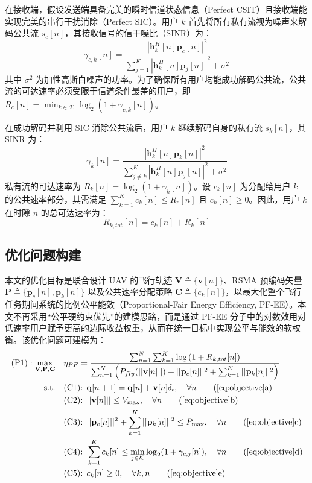 \documentclass[journal,onecolumn]{IEEEtran}
\begin{document}
	在接收端，假设发送端具备完美的瞬时信道状态信息（Perfect CSIT）且接收端能实现完美的串行干扰消除（Perfect SIC）。用户 $k$ 首先将所有私有流视为噪声来解码公共流 $s_c[n]$，其接收信号的信干噪比（SINR）为：
	\begin{equation}
		\gamma_{c,k}[n] = \frac{|\mathbf{h}_k^H[n] \mathbf{p}_c[n]|^2}{\sum_{j=1}^K |\mathbf{h}_k^H[n] \mathbf{p}_j[n]|^2 + \sigma^2}
		\label{eq:sinr_c}
	\end{equation}
	其中 $\sigma^2$ 为加性高斯白噪声的功率。为了确保所有用户均能成功解码公共流，公共流的可达速率必须受限于信道条件最差的用户，即 $R_c[n] = \min_{k \in \mathcal{K}} \log_2(1 + \gamma_{c,k}[n])$。
	
	在成功解码并利用 SIC 消除公共流后，用户 $k$ 继续解码自身的私有流 $s_k[n]$，其 SINR 为：
	\begin{equation}
		\gamma_k[n] = \frac{|\mathbf{h}_k^H[n] \mathbf{p}_k[n]|^2}{\sum_{j \neq k}^K |\mathbf{h}_k^H[n] \mathbf{p}_j[n]|^2 + \sigma^2}
		\label{eq:sinr_k}
	\end{equation}
	私有流的可达速率为 $R_k[n] = \log_2(1 + \gamma_k[n])$。设 $c_k[n]$ 为分配给用户 $k$ 的公共速率部分，其需满足 $\sum_{k=1}^K c_k[n] \leq R_c[n]$ 且 $c_k[n] \geq 0$。因此，用户 $k$ 在时隙 $n$ 的总可达速率为：
	\begin{equation}
		R_{k,tot}[n] = c_k[n] + R_k[n]
		\label{eq:total_rate}
	\end{equation}
	
	\subsection{优化问题构建}
	本文的优化目标是联合设计 UAV 的飞行轨迹 $\mathbf{V} \triangleq \{\mathbf{v}[n]\}$、RSMA 预编码矢量 $\mathbf{P} \triangleq \{\mathbf{p}_c[n], \mathbf{p}_k[n]\}$ 以及公共速率分配策略 $\mathbf{C} \triangleq \{c_k[n]\}$，以最大化整个飞行任务期间系统的比例公平能效（Proportional-Fair Energy Efficiency, PF-EE）。本文不再采用“公平硬约束优先”的建模思路，而是通过 PF-EE 分子中的对数效用对低速率用户赋予更高的边际收益权重，从而在统一目标中实现公平与能效的软权衡。该优化问题可建模为：
	\begin{align}
		\text{(P1)}: \max_{\mathbf{V}, \mathbf{P}, \mathbf{C}} \quad & \eta_{PF} = \frac{\sum_{n=1}^N \sum_{k=1}^K \log\left(1 + R_{k,tot}[n]\right)}{\sum_{n=1}^N \left( P_{fly}(||\mathbf{v}[n]||) + ||\mathbf{p}_c[n]||^2 + \sum_{k=1}^K ||\mathbf{p}_k[n]||^2 \right)} \label{eq:objective} \\
		\text{s.t.} \quad 
		& \text{(C1): } \mathbf{q}[n+1] = \mathbf{q}[n] + \mathbf{v}[n] \delta_t, \quad \forall n \tag{\ref{eq:objective}a} \\
		& \text{(C2): } ||\mathbf{v}[n]|| \leq V_{\max}, \quad \forall n \tag{\ref{eq:objective}b} \\
		& \text{(C3): } ||\mathbf{p}_c[n]||^2 + \sum_{k=1}^K ||\mathbf{p}_k[n]||^2 \leq P_{\max}, \quad \forall n \tag{\ref{eq:objective}c} \\
		& \text{(C4): } \sum_{k=1}^K c_k[n] \leq \min_{j \in \mathcal{K}} \log_2(1 + \gamma_{c,j}[n]), \quad \forall n \tag{\ref{eq:objective}d} \\
		& \text{(C5): } c_k[n] \geq 0, \quad \forall k, n \tag{\ref{eq:objective}e}
	\end{align}
	
\end{document}
